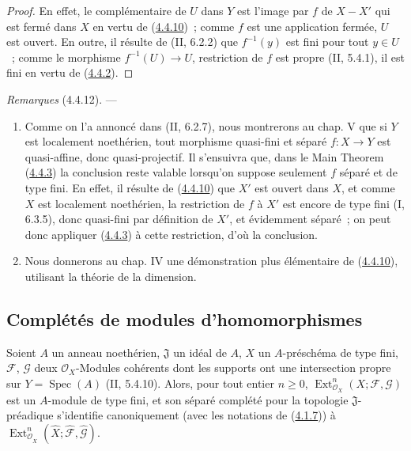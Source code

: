 \begin{proof}
En effet, le complémentaire de $U$ dans $Y$ est l'image par $f$ de $X-X'$ qui
est fermé dans $X$ en vertu de (\hyperref[III.4.4.10-fr]{4.4.10})~; comme $f$
est une application fermée, $U$ est ouvert. En outre, il résulte de
(II, 6.2.2) que $f^{-1}(y)$ est fini pour tout $y\in U$~; comme le morphisme
$f^{-1}(U)\to U$, restriction de $f$ est propre (II, 5.4.1), il est fini en
vertu de (\hyperref[III.4.4.2-fr]{4.4.2}).
\end{proof}

\begin{env}[4.4.12]
\label{III.4.4.12-fr}
\emph{Remarques} (4.4.12). ---
\begin{enumerate}
\item[(i)] Comme on l'a annoncé dans (II, 6.2.7), nous montrerons au chap. V
que si $Y$ est localement noethérien, tout morphisme quasi-fini et séparé
$f:X\to Y$ est quasi-affine, donc quasi-projectif. Il s'ensuivra que, dans le
Main Theorem (\hyperref[III.4.4.3-fr]{4.4.3}) la conclusion reste valable
lorsqu'on suppose seulement $f$ séparé et de type fini. En effet, il résulte
de (\hyperref[III.4.4.10-fr]{4.4.10}) que $X'$ est ouvert dans $X$, et comme
$X$ est localement noethérien, la restriction de $f$ à $X'$ est encore de
type fini (I, 6.3.5), donc quasi-fini par définition de $X'$, et évidemment
séparé~; on peut donc appliquer (\hyperref[III.4.4.3-fr]{4.4.3}) à cette
restriction, d'où la conclusion.

\item[(ii)] Nous donnerons au chap. IV une démonstration plus élémentaire de
(\hyperref[III.4.4.10-fr]{4.4.10}), utilisant la théorie de la dimension.
\end{enumerate}
\end{env}

\subsection{Complétés de modules d'homomorphismes}
\label{subsection:III.4.5-fr}

\begin{proposition}[4.5.1]
\label{III.4.5.1-fr}
Soient $A$ un anneau noethérien, $\mathfrak J$ un idéal de $A$, $X$ un
$A$-préschéma de type fini, $\mathcal F$, $\mathcal G$ deux
$\mathcal O_X$-Modules cohérents dont les supports ont une intersection
propre sur $Y=\operatorname{Spec}(A)$ (II, 5.4.10). Alors, pour tout entier
$n\geq0$, $\operatorname{Ext}^n_{\mathcal O_X}(X;\mathcal F,\mathcal G)$ est un $A$-module
de type fini, et son séparé complété pour la topologie $\mathfrak J$-préadique
s'identifie canoniquement (avec les notations de
(\hyperref[III.4.1.7-fr]{4.1.7})) à
$\operatorname{Ext}^n_{\mathcal O_{\widehat X}}(\widehat X;\widehat{\mathcal F},
\widehat{\mathcal G})$.
\end{proposition}

